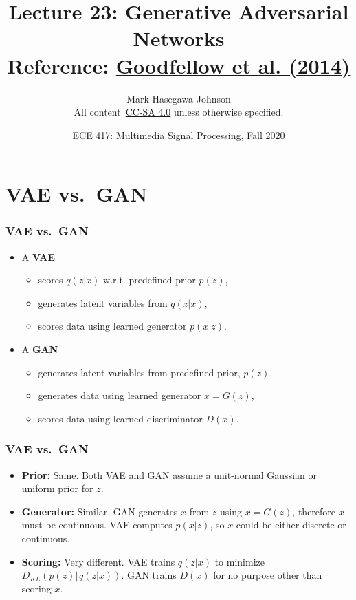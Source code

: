 \documentclass{beamer}
\title{Lecture 23: Generative Adversarial Networks\\Reference: \href{http://papers.nips.cc/paper/5423-generative-adversarial-nets.pdf}{Goodfellow et al. (2014)}}
\author{Mark Hasegawa-Johnson\\All content~\href{https://creativecommons.org/licenses/by-sa/4.0/}{CC-SA 4.0} unless otherwise specified.}
\date{ECE 417: Multimedia Signal Processing, Fall 2020}
\institute{University of Illinois}
\begin{document}
\begin{frame}
  \maketitle
\end{frame}

\begin{frame}
  \tableofcontents
\end{frame}

\section{VAE vs.~GAN}
\setcounter{subsection}{1}

\begin{frame}
  \frametitle{VAE vs.~GAN}
  \begin{itemize}
  \item A {\bf VAE}
    \begin{itemize}
    \item scores $q(z|x)$  w.r.t. predefined prior $p(z)$,
    \item generates latent variables from $q(z|x)$,
    \item scores data using learned generator $p(x|z)$.
    \end{itemize}
  \item A {\bf GAN}
    \begin{itemize}
    \item generates latent variables from predefined prior, $p(z)$,
    \item generates data using learned generator $x=G(z)$,
    \item scores data using learned discriminator $D(x)$.
    \end{itemize}
  \end{itemize}
\end{frame}

\begin{frame}
  \frametitle{VAE vs.~GAN}

  \begin{itemize}
  \item {\bf Prior:} Same.  Both VAE and GAN assume a unit-normal Gaussian or uniform prior for $z$.
  \item {\bf Generator:} Similar.  GAN generates $x$ from $z$ using $x=G(z)$,
    therefore $x$ must be continuous.  VAE computes $p(x|z)$, so $x$
    could be either discrete or continuous.
  \item {\bf Scoring:} Very different.  VAE trains $q(z|x)$ to
    minimize $D_{KL}(p(z)\Vert q(z|x))$.  GAN trains $D(x)$ for no
    purpose other than scoring $x$.
  \end{itemize}
\end{frame}
\end{document}
